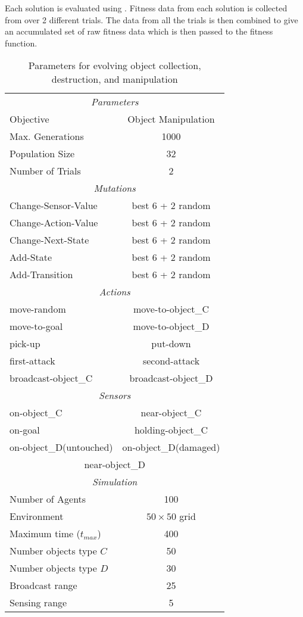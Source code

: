Each solution is evaluated using \SWEEP{}.  Fitness data from each solution is collected from \SWEEP over 2 different trials.  The data from all the trials is then combined to give an accumulated set of raw fitness data which is then passed to the fitness function.

\begin{table}[ht]
  \centering
  \small
  \begin{tabular}{|lc|}
    \hline
    \multicolumn{2}{|c|}{\em{Parameters}} \\
    Objective & Object Manipulation \\
    Max. Generations & 1000 \\
    Population Size & 32 \\
    Number of Trials & 2 \\
    \hline
    \hline
    \multicolumn{2}{|c|}{\em{Mutations}} \\
    Change-Sensor-Value & best 6 + 2 random \\
    Change-Action-Value & best 6 + 2 random \\
    Change-Next-State   & best 6 + 2 random \\
    Add-State           & best 6 + 2 random \\
    Add-Transition      & best 6 + 2 random \\
    \hline
    \hline
    \multicolumn{2}{|c|}{\em{Actions}} \\
    move-random         & move-to-object\_C   \\
    move-to-goal        & move-to-object\_D   \\
    pick-up             & put-down            \\
    first-attack        & second-attack       \\
    broadcast-object\_C & broadcast-object\_D \\
    \hline
    \multicolumn{2}{|c|}{\em{Sensors}} \\
    on-object\_C            & near-object\_C        \\
    on-goal                 & holding-object\_C     \\
    on-object\_D(untouched) & on-object\_D(damaged) \\
    \multicolumn{2}{|c|}{near-object\_D}            \\
    \hline
    \hline
    \multicolumn{2}{|c|}{\em{Simulation}} \\
    Number of Agents & 100 \\
    Environment & $50 \times 50$ grid \\
    Maximum time ($t_{max}$) & 400 \\
    Number objects type $C$ & 50 \\
    Number objects type $D$ & 30 \\
    Broadcast range & 25 \\
    Sensing range & 5 \\
    \hline 
  \end{tabular}
\caption{Parameters for evolving object collection, destruction, and manipulation}
\label{tab:ManipulationParameters}
\end{table}

